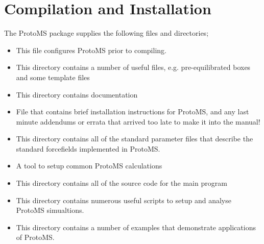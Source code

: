 \documentclass[letterpaper,10pt,english]{sphinxmanual}
\begin{document}
\chapter{Compilation and Installation}
\label{\detokenize{compilation:compilation-and-installation}}\label{\detokenize{compilation::doc}}
The ProtoMS package supplies the following files and directories;
\begin{itemize}
\item {} 
 This file configures ProtoMS prior to compiling.

\item {} 
 This directory contains a number of useful files, e.g. pre-equilibrated boxes and some template files

\item {} 
 This directory contains documentation

\item {} 
 File that contains brief installation instructions for ProtoMS, and any last minute addendums or errata that arrived too late to make it into the manual!

\item {} 
 This directory contains all of the standard parameter files that describe the standard forcefields implemented in ProtoMS.

\item {} 
 A tool to setup common ProtoMS calculations

\item {} 
 This directory contains all of the source code for the main program

\item {} 
 This directory contains numerous useful scripts to setup and analyse ProtoMS simualtions.

\item {} 
 This directory contains a number of examples that demonstrate applications of ProtoMS.

\end{itemize}
\end{document}
